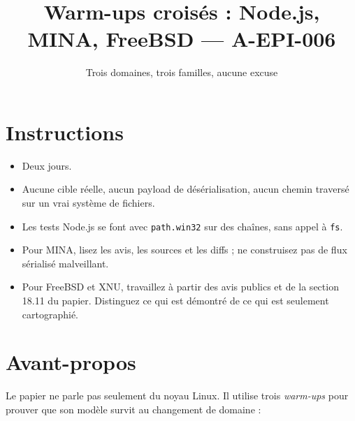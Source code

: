 \documentclass{training}
\begin{document}
\title{Warm-ups croisés : Node.js, MINA, FreeBSD --- A-EPI-006}
\subtitle{Trois domaines, trois familles, aucune excuse}
\maketitle

\newpage
\tableofcontents
\newpage

\chapter{Instructions}
\begin{itemize}
  \item Deux jours.
  \item Aucune cible réelle, aucun payload de désérialisation, aucun chemin
        traversé sur un vrai système de fichiers.
  \item Les tests Node.js se font avec \texttt{path.win32} sur des chaînes,
        sans appel à \texttt{fs}.
  \item Pour MINA, lisez les avis, les sources et les diffs ; ne construisez
        pas de flux sérialisé malveillant.
  \item Pour FreeBSD et XNU, travaillez à partir des avis publics et de la
        section 18.11 du papier. Distinguez ce qui est démontré de ce qui
        est seulement cartographié.
\end{itemize}





\chapter{Avant-propos}

Le papier ne parle pas seulement du noyau Linux. Il utilise trois
\emph{warm-ups} pour prouver que son modèle survit au changement de domaine :
\end{document}
